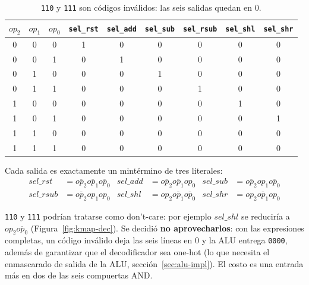 \documentclass[11pt,a4paper]{article}
\newcommand{\bit}[1]{\texttt{#1}}
\newcommand{\sig}[1]{\texttt{#1}}
\newcommand{\nott}[1]{\overline{#1}}
\begin{document}
\begin{table}[H]
\centering
\begin{tabular}{@{}ccc|cccccc@{}}
\toprule
$op_2$&$op_1$&$op_0$ & \sig{sel\_rst}&\sig{sel\_add}&\sig{sel\_sub}&\sig{sel\_rsub}&\sig{sel\_shl}&\sig{sel\_shr} \\
\midrule
0&0&0& 1&0&0&0&0&0 \\
0&0&1& 0&1&0&0&0&0 \\
0&1&0& 0&0&1&0&0&0 \\
0&1&1& 0&0&0&1&0&0 \\
1&0&0& 0&0&0&0&1&0 \\
1&0&1& 0&0&0&0&0&1 \\
1&1&0& 0&0&0&0&0&0 \\
1&1&1& 0&0&0&0&0&0 \\
\bottomrule
\end{tabular}
\caption{\bit{110} y \bit{111} son códigos inválidos: las seis salidas quedan en 0.}
\end{table}

Cada salida es exactamente un mintérmino de tres literales:
\[
\begin{aligned}
\mathit{sel\_rst}  &= \nott{op_2}\nott{op_1}\nott{op_0} &
\mathit{sel\_add}  &= \nott{op_2}\nott{op_1}op_0 &
\mathit{sel\_sub}  &= \nott{op_2}op_1\nott{op_0} \\
\mathit{sel\_rsub} &= \nott{op_2}op_1op_0 &
\mathit{sel\_shl}  &= op_2\nott{op_1}\nott{op_0} &
\mathit{sel\_shr}  &= op_2\nott{op_1}op_0
\end{aligned}
\]

\bit{110} y \bit{111} podrían tratarse como don't-care: por ejemplo $\mathit{sel\_shl}$ se reduciría a $op_2\nott{op_0}$ (Figura~\ref{fig:kmap-dec}). Se decidió \textbf{no aprovecharlos}: con las expresiones completas, un código inválido deja las seis líneas en 0 y la ALU entrega \bit{0000}, además de garantizar que el decodificador sea one-hot (lo que necesita el enmascarado de salida de la ALU, sección~\ref{sec:alu-impl}). El costo es una entrada más en dos de las seis compuertas AND.
\end{document}
